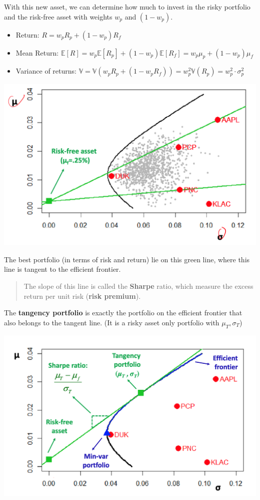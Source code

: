 \documentclass[
  oneside]{book}
\providecommand{\tightlist}{%
  \setlength{\itemsep}{0pt}\setlength{\parskip}{0pt}}
\begin{document}
With this new asset, we can determine how much to invest in the risky portfolio and the risk-free asset with weights \(w_{p}\) and \((1-w_{p})\).

\begin{itemize}
\tightlist
\item
  Return: \(R=w_{p}R_{p}+(1-w_{p})R_{f}\)
\item
  Mean Return: \(\mathbb{E}[R]=w_{p}\mathbb{E}[R_{p}]+(1-w_{p})\mathbb{E}[R_{f}]=w_{p}\mu_{p}+(1-w_{p})\mu_{f}\)
\item
  Variance of returns: \(\mathbb{V}=\mathbb{V}(w_{p}R_{p}+(1-w_{p}R_{f})) = w_{p}^{2}\mathbb{V}(R_{p})=w_{p}^{2}\cdot \sigma_{p}^{2}\)
\end{itemize}

\includegraphics{Notes/Obsidian-Attachments/5-Portfolio-Theory-1.png}

The best portfolio (in terms of risk and return) lie on this green line, where this line is tangent to the efficient frontier.

\begin{quote}
The slope of this line is called the \textbf{Sharpe} ratio, which measure the excess return per unit risk (\textbf{risk premium}).
\end{quote}

The \textbf{tangency portfolio} is exactly the portfolio on the efficient frontier that also belongs to the tangent line. (It is a risky asset only portfolio with \(\mu_{T},\sigma_{T}\))

\includegraphics{Notes/Obsidian-Attachments/5-Portfolio-Theory-2.png}
\end{document}
